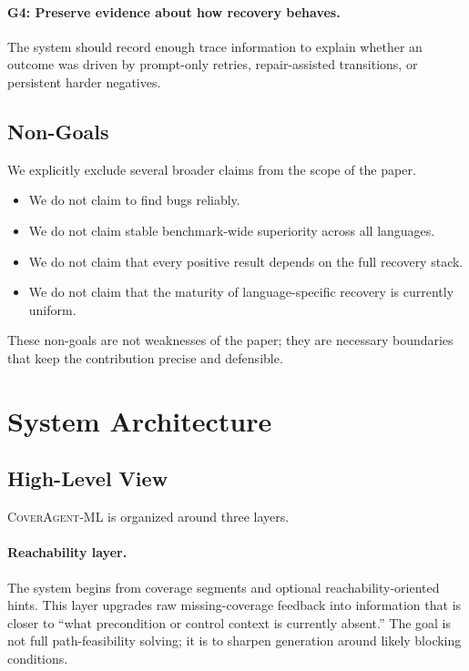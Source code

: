\documentclass[10pt]{article}
\begin{document}
\paragraph{G4: Preserve evidence about how recovery behaves.}
The system should record enough trace information to explain whether an outcome was driven by prompt-only retries, repair-assisted transitions, or persistent harder negatives.

\subsection{Non-Goals}

We explicitly exclude several broader claims from the scope of the paper.

\begin{itemize}[leftmargin=1.4em]
    \item We do not claim to find bugs reliably.
    \item We do not claim stable benchmark-wide superiority across all languages.
    \item We do not claim that every positive result depends on the full recovery stack.
    \item We do not claim that the maturity of language-specific recovery is currently uniform.
\end{itemize}

These non-goals are not weaknesses of the paper; they are necessary boundaries that keep the contribution precise and defensible.

\section{System Architecture}
\label{sec:architecture}

\subsection{High-Level View}

\textsc{CoverAgent-ML} is organized around three layers.

\paragraph{Reachability layer.}
The system begins from coverage segments and optional reachability-oriented hints. This layer upgrades raw missing-coverage feedback into information that is closer to ``what precondition or control context is currently absent.'' The goal is not full path-feasibility solving; it is to sharpen generation around likely blocking conditions.
\end{document}
